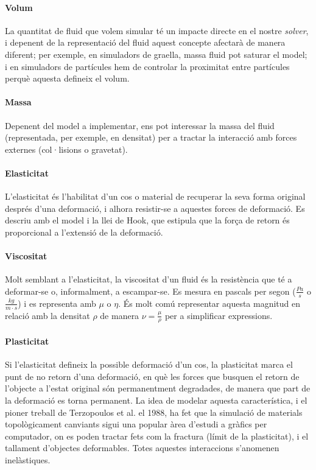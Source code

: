 \documentclass[a4paper]{report}
\begin{document}
	\paragraph{Volum} La quantitat de fluid que volem simular té un impacte directe en el nostre \textit{solver}, i depenent de la representació del fluid aquest concepte afectarà de manera diferent; per exemple, en simuladors de graella, massa fluid pot saturar el model; i en simuladors de partícules hem de controlar la proximitat entre partícules perquè aquesta defineix el volum.
	\paragraph{Massa} Depenent del model a implementar, ens pot interessar la massa del fluid (representada, per exemple, en densitat) per a tractar la interacció amb forces externes (col·lisions o gravetat).
	\paragraph{Elasticitat} L'elasticitat és l'habilitat d'un cos o material de recuperar la seva forma original després d'una deformació, i alhora resistir-se a aquestes forces de deformació. Es descriu amb el model i la llei de Hook, que estipula que la força de retorn és proporcional a l'extensió de la deformació.
	\paragraph{Viscositat} Molt semblant a l'elasticitat, la viscositat d'un fluid és la resistència que té a deformar-se o, informalment, a escampar-se. Es mesura en pascals per segon ($\frac{Pa}{s}$ o $\frac{kg}{m \cdot s}$) i es representa amb $\mu$ o $\eta$. És molt comú representar aquesta magnitud en relació amb la densitat $\rho$ de manera $\nu = \frac{\mu}{\rho}$ per a simplificar expressions.
	\paragraph{Plasticitat} Si l'elasticitat defineix la possible deformació d'un cos, la plasticitat marca el punt de no retorn d'una deformació, en què les forces que busquen el retorn de l'objecte a l'estat original són permanentment degradades, de manera que part de la deformació es torna permanent. La idea de modelar aquesta característica, i el pioner treball de Terzopoulos et al. \cite{Terzopoulos:1988:MID:378456.378522} el 1988, ha fet que la simulació de materials topològicament canviants sigui una popular àrea d'estudi a gràfics per computador, on es poden tractar fets com la fractura (límit de la plasticitat), i el tallament d'objectes deformables. Totes aquestes interaccions s'anomenen inelàstiques.
\end{document}
